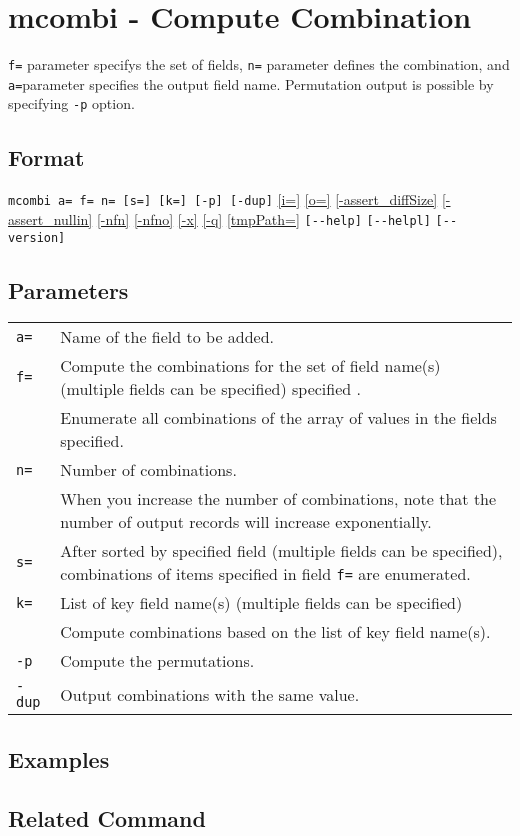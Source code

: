 
%

\section{mcombi - Compute Combination\label{sect:mcombi}}
\verb|f=| parameter specifys the set of fields, \verb|n=| parameter defines the combination, and \verb|a=|parameter specifies the output field name. Permutation output is possible by specifying  \verb|-p| option. 

\subsection*{Format}
\verb/mcombi a= f= n= [s=] [k=] [-p] [-dup]/
\hyperref[sect:option_i]{[i=]}
\hyperref[sect:option_o]{[o=]}
\hyperref[sect:option_assert_diffSize]{[-assert\_diffSize]}
\hyperref[sect:option_assert_nullin]{[-assert\_nullin]}
\hyperref[sect:option_nfn]{[-nfn]} 
\hyperref[sect:option_nfno]{[-nfno]}  
\hyperref[sect:option_x]{[-x]}
\hyperref[sect:option_q]{[-q]}
\hyperref[sect:option_option_tmppath]{[tmpPath=]}
\verb|[--help]|
\verb|[--helpl]|
\verb|[--version]|\\

\subsection*{Parameters}
\begin{table}[htbp]
{\small
\begin{tabular}{ll}
\verb|a=|    & Name of the field to be added.\\
\verb|f=|    & Compute the combinations for the set of field name(s) (multiple fields can be specified) specified .\\
             & Enumerate all combinations of the array of values in the fields specified.\\
\verb|n=|    & Number of combinations.\\
             & When you increase the number of combinations, note that the number of output records will increase exponentially.\\
         \verb|s=|    & After sorted by specified field  (multiple fields can be specified), combinations of items specified in field \verb|f=| are enumerated. \\
\verb|k=|    & List of key field name(s) (multiple fields can be specified)\\
             & Compute  combinations based on the list of key field name(s). \\
\verb|-p|    & Compute the permutations. \\
\verb|-dup|  & Output combinations with the same value. \\
\end{tabular} 
}
\end{table} 

\subsection*{Examples}

\subsection*{Related Command}
%
